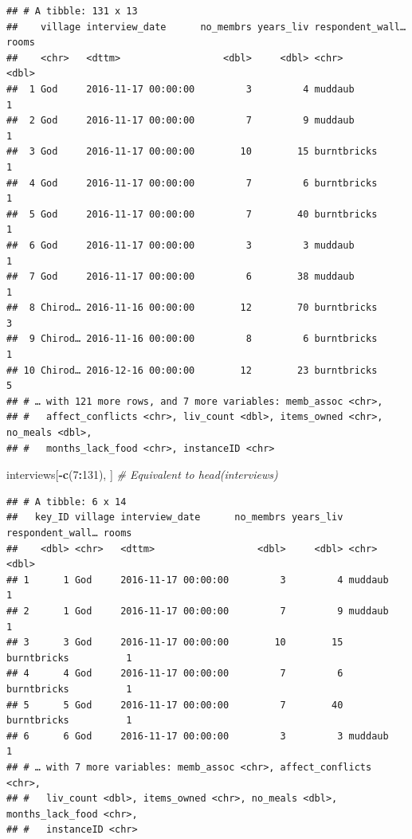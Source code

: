 \documentclass[]{book}
\newenvironment{Shaded}{\begin{snugshade}}{\end{snugshade}}
\newcommand{\KeywordTok}[1]{\textcolor[rgb]{0.13,0.29,0.53}{\textbf{#1}}}
\newcommand{\DecValTok}[1]{\textcolor[rgb]{0.00,0.00,0.81}{#1}}
\newcommand{\CommentTok}[1]{\textcolor[rgb]{0.56,0.35,0.01}{\textit{#1}}}
\newcommand{\OperatorTok}[1]{\textcolor[rgb]{0.81,0.36,0.00}{\textbf{#1}}}
\newcommand{\NormalTok}[1]{#1}
\begin{document}
\begin{verbatim}
## # A tibble: 131 x 13
##    village interview_date      no_membrs years_liv respondent_wall… rooms
##    <chr>   <dttm>                  <dbl>     <dbl> <chr>            <dbl>
##  1 God     2016-11-17 00:00:00         3         4 muddaub              1
##  2 God     2016-11-17 00:00:00         7         9 muddaub              1
##  3 God     2016-11-17 00:00:00        10        15 burntbricks          1
##  4 God     2016-11-17 00:00:00         7         6 burntbricks          1
##  5 God     2016-11-17 00:00:00         7        40 burntbricks          1
##  6 God     2016-11-17 00:00:00         3         3 muddaub              1
##  7 God     2016-11-17 00:00:00         6        38 muddaub              1
##  8 Chirod… 2016-11-16 00:00:00        12        70 burntbricks          3
##  9 Chirod… 2016-11-16 00:00:00         8         6 burntbricks          1
## 10 Chirod… 2016-12-16 00:00:00        12        23 burntbricks          5
## # … with 121 more rows, and 7 more variables: memb_assoc <chr>,
## #   affect_conflicts <chr>, liv_count <dbl>, items_owned <chr>, no_meals <dbl>,
## #   months_lack_food <chr>, instanceID <chr>
\end{verbatim}

\begin{Shaded}
\begin{Highlighting}[]
\NormalTok{interviews[}\OperatorTok{-}\KeywordTok{c}\NormalTok{(}\DecValTok{7}\OperatorTok{:}\DecValTok{131}\NormalTok{), ]   }\CommentTok{# Equivalent to head(interviews)}
\end{Highlighting}
\end{Shaded}

\begin{verbatim}
## # A tibble: 6 x 14
##   key_ID village interview_date      no_membrs years_liv respondent_wall… rooms
##    <dbl> <chr>   <dttm>                  <dbl>     <dbl> <chr>            <dbl>
## 1      1 God     2016-11-17 00:00:00         3         4 muddaub              1
## 2      1 God     2016-11-17 00:00:00         7         9 muddaub              1
## 3      3 God     2016-11-17 00:00:00        10        15 burntbricks          1
## 4      4 God     2016-11-17 00:00:00         7         6 burntbricks          1
## 5      5 God     2016-11-17 00:00:00         7        40 burntbricks          1
## 6      6 God     2016-11-17 00:00:00         3         3 muddaub              1
## # … with 7 more variables: memb_assoc <chr>, affect_conflicts <chr>,
## #   liv_count <dbl>, items_owned <chr>, no_meals <dbl>, months_lack_food <chr>,
## #   instanceID <chr>
\end{verbatim}
\end{document}
